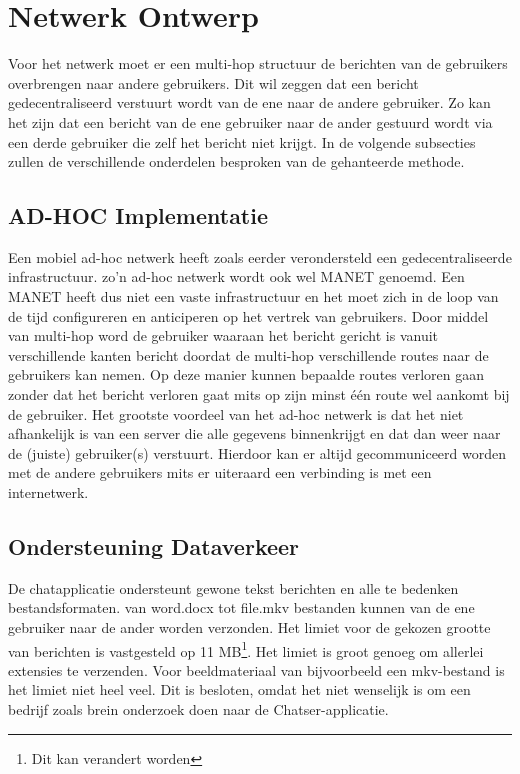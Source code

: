 \documentclass[12pt]{article}
\begin{document}
\section{Netwerk Ontwerp}
Voor het netwerk moet er een multi-hop structuur de berichten van de gebruikers overbrengen naar andere gebruikers. Dit wil zeggen dat een bericht gedecentraliseerd verstuurt wordt van de ene naar de andere gebruiker. Zo kan het zijn dat een bericht van de ene gebruiker naar de ander gestuurd wordt via een derde gebruiker die zelf het bericht niet krijgt. In de volgende subsecties zullen de verschillende onderdelen besproken van de gehanteerde methode. 

\subsection{AD-HOC Implementatie}
Een mobiel ad-hoc netwerk heeft zoals eerder verondersteld een gedecentraliseerde infrastructuur. zo'n ad-hoc netwerk wordt ook wel MANET genoemd. Een MANET heeft dus niet een vaste infrastructuur en het moet zich in de loop van de tijd configureren en anticiperen op het vertrek van gebruikers. Door middel van multi-hop  word de gebruiker waaraan het bericht gericht is vanuit verschillende kanten bericht doordat de multi-hop verschillende routes naar de gebruikers kan nemen. Op deze manier kunnen bepaalde routes verloren gaan zonder dat het bericht verloren gaat mits op zijn minst \'e\'en route wel aankomt bij de gebruiker. Het grootste voordeel van het ad-hoc netwerk is dat het niet afhankelijk is van een server die alle gegevens binnenkrijgt en dat dan weer naar de (juiste) gebruiker(s) verstuurt. Hierdoor kan er altijd gecommuniceerd worden met de andere gebruikers mits er uiteraard een verbinding is met een internetwerk.

\subsection{Ondersteuning Dataverkeer}
De chatapplicatie ondersteunt gewone tekst berichten en alle te bedenken bestandsformaten. van word.docx tot file.mkv bestanden kunnen van de ene gebruiker naar de ander worden verzonden. Het limiet voor de gekozen grootte van berichten is vastgesteld op 11 MB\footnote{Dit kan verandert worden}. Het limiet is groot genoeg om allerlei extensies te verzenden. Voor beeldmateriaal van bijvoorbeeld een mkv-bestand is het limiet niet heel veel. Dit is besloten, omdat het niet wenselijk is om een bedrijf zoals brein onderzoek doen naar de Chatser-applicatie\small\textcopyright.
\end{document}
